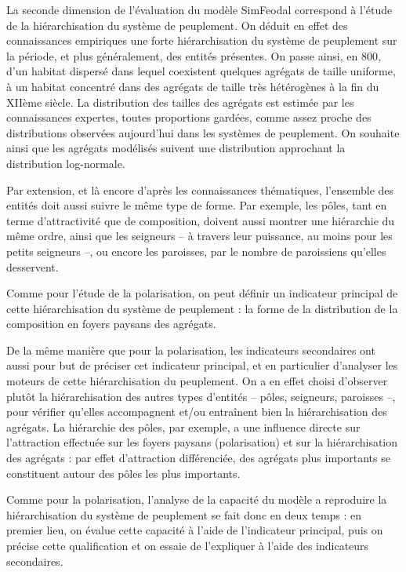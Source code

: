 La seconde dimension de l'évaluation du modèle SimFeodal correspond à l'étude de la hiérarchisation du système de peuplement.
On déduit en effet des connaissances empiriques une forte hiérarchisation du système de peuplement sur la période, et plus généralement, des entités présentes.
On passe ainsi, en 800, d'un habitat dispersé dans lequel coexistent quelques agrégats de taille uniforme, à un habitat concentré dans des agrégats de taille très hétérogènes à la fin du XIIème siècle.
La distribution des tailles des agrégats est estimée par les connaissances expertes, toutes proportions gardées, comme assez proche des distributions observées aujourd'hui dans les systèmes de peuplement.
On souhaite ainsi que les agrégats modélisés suivent une distribution approchant la distribution log-normale.

Par extension, et là encore d'après les connaissances thématiques, l'ensemble des entités doit aussi suivre le même type de forme.
Par exemple, les pôles, tant en terme d'attractivité que de composition, doivent aussi montrer une hiérarchie du même ordre, ainsi que les seigneurs -- à travers leur puissance, au moins pour les petits seigneurs --, ou encore les paroisses, par le nombre de paroissiens qu'elles desservent.

Comme pour l'étude de la polarisation, on peut définir un indicateur principal de cette hiérarchisation du système de peuplement :
la forme de la distribution de la composition en foyers paysans des agrégats.

De la même manière que pour la polarisation, les indicateurs secondaires ont aussi pour but de préciser cet indicateur principal, et en particulier d'analyser les moteurs de cette hiérarchisation du peuplement.
On a en effet choisi d'observer plutôt la hiérarchisation des autres types d'entités -- pôles, seigneurs, paroisses --, pour vérifier qu'elles accompagnent et/ou entraînent bien la hiérarchisation des agrégats.
La hiérarchie des pôles, par exemple, a une influence directe sur l'attraction effectuée sur les foyers paysans (polarisation) et sur la hiérarchisation des agrégats :
par effet d'attraction différenciée, des agrégats plus importants se constituent autour des pôles les plus importants.

Comme pour la polarisation, l'analyse de la capacité du modèle a reproduire la hiérarchisation du système de peuplement se fait donc en deux temps :
en premier lieu, on évalue cette capacité à l'aide de l'indicateur principal, puis on précise cette qualification et on essaie de l'expliquer à l'aide des indicateurs secondaires.

